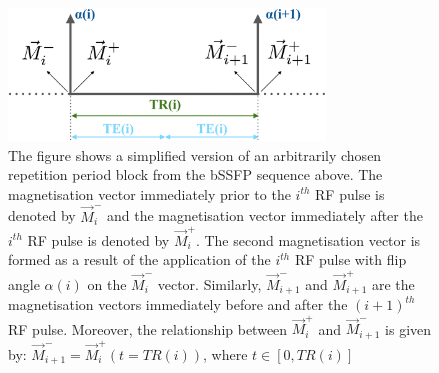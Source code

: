 \begin{figure}[ht]
    \centering
    \includegraphics[angle=0,width=0.75\textwidth, keepaspectratio]{images/mrf/sequencebSSFPOneBlock}
    \caption{The figure shows a simplified version of an arbitrarily chosen repetition period block from the bSSFP sequence above.
    The magnetisation vector immediately prior to the $i^{th}$ RF pulse is denoted by $\vec{M}^-_i$ and the magnetisation vector immediately after the $i^{th}$ RF pulse is denoted by $\vec{M}^+_i$.
    The second magnetisation vector is formed as a result of the application of the $i^{th}$ RF pulse with flip angle $\alpha(i)$ on the $\vec{M}^-_i$ vector.
    Similarly, $\vec{M}^-_{i+1}$ and $\vec{M}^+_{i+1}$ are the magnetisation vectors immediately before and after the $(i+1)^{th}$ RF pulse.
    Moreover, the relationship between $\vec{M}^+_{i}$ and $\vec{M}^-_{i+1}$ is given by: $ \vec{M}^-_{i+1} = \vec{M}^+_{i}(t = TR(i))$, where $t \in [0, TR(i)]$ }
    \label{fig:sequencebSSFPOneBlock}
\end{figure}

